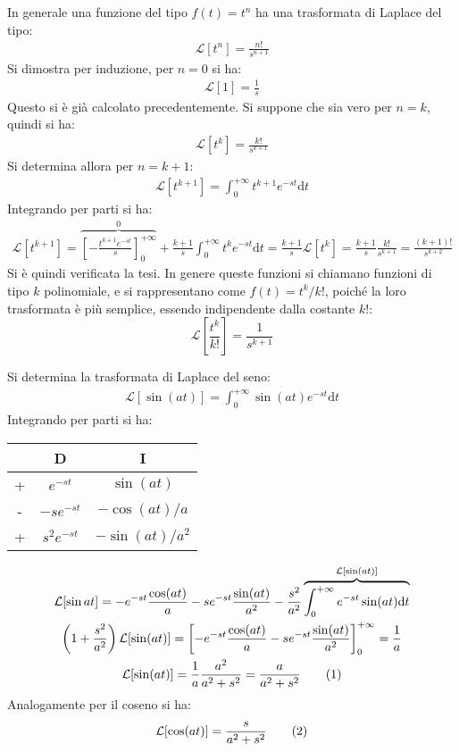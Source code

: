 \documentclass{article}
\newcommand{\df}{\mathrm{d}}
\numberwithin{equation}{subsection}
\newcommand{\tageq}{\tag{\stepcounter{equation}\theequation}}
\begin{document}
In generale una funzione del tipo $f(t)=t^n$ ha una trasformata di Laplace del tipo:
\begin{gather}
    \mathcal{L}\left[t^n\right]=\frac{n!}{s^{n+1}}
\end{gather}
Si dimostra per induzione, per $n=0$ si ha:
\begin{gather*}
    \mathcal{L}[1]=\frac{1}{s}
\end{gather*}
Questo si è già calcolato precedentemente. 
Si suppone che sia vero per $n=k$, quindi si ha:
\begin{gather*}
    \mathcal{L}\left[t^{k}\right]=\frac{k!}{s^{k+1}}
\end{gather*}
Si determina allora per $n=k+1$:
\begin{gather*}
    \mathcal{L}\left[t^{k+1}\right]=\int_0^{+\infty} t^{k+1}e^{-st}\df t
\end{gather*}
Integrando per parti si ha:
\begin{gather*}
    \mathcal{L}\left[t^{k+1}\right]=\overbrace{\left[-\frac{t^{k+1}e^{-st}}{s}\right]_0^{+\infty}}^0+\frac{k+1}{s}\int_0^{+\infty}t^ke^{-st}\df t=\frac{k+1}{s}\mathcal{L}\left[t^k\right]=\frac{k+1}{s}\frac{k!}{s^{k+1}}=\frac{(k+1)!}{s^{k+2}}
\end{gather*}
Si è quindi verificata la tesi. In genere queste funzioni si chiamano funzioni di tipo $k$ polinomiale, e si rappresentano come $f(t)=t^k/k!$, poiché la loro trasformata è più semplice, essendo indipendente dalla costante $k!$:
\begin{equation}
    \mathcal{L}\left[\frac{t^k}{k!}\right]=\frac{1}{s^{k+1}}
\end{equation}


Si determina la trasformata di Laplace del seno:
\begin{gather*}
    \mathcal{L}\left[\sin(at)\right]=\int_0^{+\infty}\sin(at)e^{-st}\df t
\end{gather*}
Integrando per parti si ha:
\begin{center}
    \begin{tabular}{|c|c|c|}
        \hline
        &D&I\\\hline
        +&$e^{-st}$&$\sin(at)$\\\hline
        -&$-se^{-st}$&$-\cos(at)/a$\\\hline
        +&$s^2e^{-st}$&$-\sin(at)/a^2$\\\hline
    \end{tabular}
\end{center}
\begin{gather*}
    \mathcal{L}[\sin at]=-e^{-st}\frac{\cos(at)}{a}-se^{-st}\frac{\sin(at)}{a^2}-\frac{s^2}{a^2}\overbrace{\int_0^{+\infty}e^{-st}\sin(at)\df t}^{\mathcal{L}[\sin(at)]}\\
    \left(1+\frac{s^2}{a^2}\right)\mathcal{L}[\sin(at)]=\left[-e^{-st}\frac{\cos(at)}{a}-se^{-st}\frac{\sin(at)}{a^2}\right]_0^{+\infty}=\frac{1}{a}\\
    \mathcal{L}[\sin(at)]=\frac{1}{a}\frac{a^2}{a^2+s^2}=\frac{a}{a^2+s^2}\tageq
\end{gather*}
Analogamente per il coseno si ha:
\begin{equation}
    \mathcal{L}[\cos(at)]=\frac{s}{a^2+s^2}\tageq
\end{equation}
\end{document}
